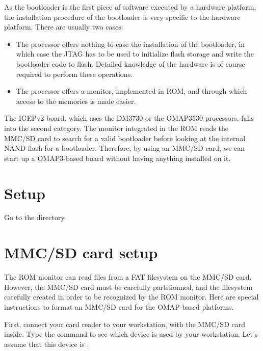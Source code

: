 
As the bootloader is the first piece of software executed by a
hardware platform, the installation procedure of the bootloader is
very specific to the hardware platform. There are usually two cases:

\begin{itemize}

\item The processor offers nothing to ease the installation of the
  bootloader, in which case the JTAG has to be used to initialize
  flash storage and write the bootloader code to flash. Detailed
  knowledge of the hardware is of course required to perform these
  operations.

\item The processor offers a monitor, implemented in ROM, and through
  which access to the memories is made easier.

\end{itemize}

The IGEPv2 board, which uses the DM3730 or the OMAP3530 processors, falls into
the second category. The monitor integrated in the ROM reads the MMC/SD
card to search for a valid bootloader before looking at the internal
NAND flash for a bootloader. Therefore, by using an MMC/SD card, we can
start up a OMAP3-based board without having anything installed on it.

\section{Setup}

Go to the  directory.

\section{MMC/SD card setup}

The ROM monitor can read files from a FAT filesystem on the MMC/SD
card. However, the MMC/SD card must be carefully partitionned, and the
filesystem carefully created in order to be recognized by the ROM
monitor. Here are special instructions to format an MMC/SD card
for the OMAP-based platforms.

First, connect your card reader to your workstation, with the MMC/SD
card inside. Type the  command to see which device is used
by your workstation. Let's assume that this device is .

